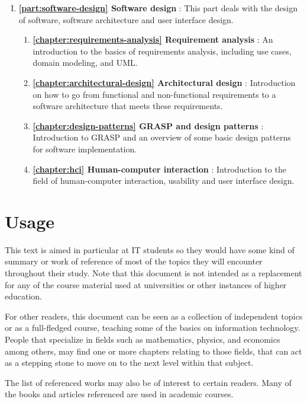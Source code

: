 \begin{enumerate}[I.]
	\item \textbf{\autoref{part:software-design} Software design} : This part deals with the design of software, software architecture and user interface design.
		\begin{enumerate}[1.]
			\item \textbf{\autoref{chapter:requirements-analysis} Requirement analysis} : An introduction to the basics of requirements analysis, including use cases, domain modeling, and UML.
			\item \textbf{\autoref{chapter:architectural-design} Architectural design} : Introduction on how to go from functional and non-functional requirements to a software architecture that meets these requirements.
			\item \textbf{\autoref{chapter:design-patterns} GRASP and design patterns} : Introduction to GRASP and an overview of some basic design patterns for software implementation.
			\item \textbf{\autoref{chapter:hci} Human-computer interaction} : Introduction to the field of human-computer interaction, usability and user interface design.
		\end{enumerate}
\end{enumerate}




\section*{Usage}

This text is aimed in particular at IT students so they would have some kind of summary or work of reference of most of the topics they will encounter throughout their study. Note that this document is not intended as a replacement for any of the course material used at universities or other instances of higher education.

For other readers, this document can be seen as a collection of independent topics or as a full-fledged course, teaching some of the basics on information technology. People that specialize in fields such as mathematics, physics, and economics among others, may find one or more chapters relating to those fields, that can act as a stepping stone to move on to the next level within that subject.

The list of referenced works may also be of interest to certain readers. Many of the books and articles referenced are used in academic courses.